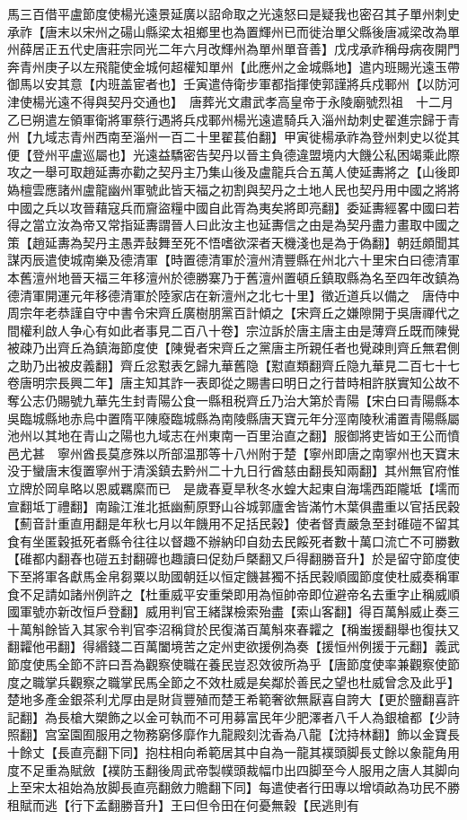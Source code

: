 馬三百借平盧節度使楊光遠景延廣以詔命取之光遠怒曰是疑我也密召其子單州刺史承祚【唐末以宋州之碭山縣梁太祖鄉里也為置輝州已而徙治單父縣後唐㓕梁改為單州薛居正五代史唐莊宗同光二年六月改輝州為單州單音善】戊戌承祚稱母病夜開門奔青州庚子以左飛龍使金城何超權知單州【此應州之金城縣地】遣内班賜光遠玉帶御馬以安其意【内班盖宦者也】壬寅遣侍衛步軍都指揮使郭謹將兵戍鄆州【以防河津使楊光遠不得與契丹交通也】　唐葬光文肅武孝高皇帝于永陵廟號烈祖　十二月乙巳朔遣左領軍衛將軍蔡行遇將兵戍鄆州楊光遠遣騎兵入淄州劫刺史翟進宗歸于青州【九域志青州西南至淄州一百二十里翟萇伯翻】甲寅徙楊承祚為登州刺史以從其便【登州平盧巡屬也】光遠益驕密告契丹以晉主負德違盟境内大饑公私困竭乘此際攻之一舉可取趙延夀亦勸之契丹主乃集山後及盧龍兵合五萬人使延夀將之【山後即媯檀雲應諸州盧龍幽州軍號此皆天福之初割與契丹之土地人民也契丹用中國之將將中國之兵以攻晉藉寇兵而齎盜糧中國自此胥為夷矣將即亮翻】委延夀經畧中國曰若得之當立汝為帝又常指延夀謂晉人曰此汝主也延夀信之由是為契丹盡力畫取中國之策【趙延夀為契丹主愚弄鼔舞至死不悟嗜欲深者天機淺也是為于偽翻】朝廷頗聞其謀丙辰遣使城南樂及德清軍【時置德清軍於澶州清豐縣在州北六十里宋白曰德清軍本舊澶州地晉天福三年移澶州於德勝寨乃于舊澶州置頓丘鎮取縣為名至四年改鎮為德清軍開運元年移德清軍於陸家店在新澶州之北七十里】徵近道兵以備之　唐侍中周宗年老恭謹自守中書令宋齊丘廣樹朋黨百計傾之【宋齊丘之嫌隙開于吳唐禪代之間權利啟人争心有如此者事見二百八十卷】宗泣訴於唐主唐主由是薄齊丘既而陳覺被疎乃出齊丘為鎮海節度使【陳覺者宋齊丘之黨唐主所親任者也覺疎則齊丘無君側之助乃出被皮義翻】齊丘忿懟表乞歸九華舊隐【懟直類翻齊丘隐九華見二百七十七卷唐明宗長興二年】唐主知其詐一表即從之賜書曰明日之行昔時相許朕實知公故不奪公志仍賜號九華先生封青陽公食一縣租税齊丘乃治大第於青陽【宋白曰青陽縣本吳臨城縣地赤烏中置隋平陳廢臨城縣為南陵縣唐天寶元年分涇南陵秋浦置青陽縣屬池州以其地在青山之陽也九域志在州東南一百里治直之翻】服御將吏皆如王公而憤邑尤甚　寧州酋長莫彦殊以所部温那等十八州附于楚【寧州即唐之南寧州也天寶末没于蠻唐末復置寧州于清溪鎮去黔州二十九日行酋慈由翻長知兩翻】其州無官府惟立牌於岡阜略以恩威羈縻而已　是歲春夏旱秋冬水蝗大起東自海壖西距隴坻【壖而宣翻坻丁禮翻】南踰江淮北抵幽薊原野山谷城郭廬舍皆滿竹木葉俱盡重以官括民穀【薊音計重直用翻是年秋七月以年饑用不足括民穀】使者督責嚴急至封碓磑不留其食有坐匿穀抵死者縣令往往以督趣不辦納印自劾去民餒死者數十萬口流亡不可勝數【碓都内翻舂也磑五封翻䃺也趣讀曰促劾戶槩翻又戶得翻勝音升】於是留守節度使下至將軍各獻馬金帛芻粟以助國朝廷以恒定饑甚獨不括民穀順國節度使杜威奏稱軍食不足請如諸州例許之【杜重威平安重榮即用為恒帥帝即位避帝名去重字止稱威順國軍號亦新改恒戶登翻】威用判官王緒謀檢索殆盡【索山客翻】得百萬斛威止奏三十萬斛餘皆入其家令判官李沼稱貸於民復滿百萬斛來春糶之【稱蚩援翻舉也復扶又翻糶他弔翻】得緡錢二百萬闔境苦之定州吏欲援例為奏【援恒州例援于元翻】義武節度使馬全節不許曰吾為觀察使職在養民豈忍效彼所為乎【唐節度使率兼觀察使節度之職掌兵觀察之職掌民馬全節之不效杜威是矣鄰於善民之望也杜威曾念及此乎】　楚地多產金銀茶利尤厚由是財貨豐殖而楚王希範奢欲無厭喜自誇大【更於鹽翻喜許記翻】為長槍大槊飾之以金可執而不可用募富民年少肥澤者八千人為銀槍都【少詩照翻】宫室園囿服用之物務窮侈靡作九龍殿刻沈香為八龍【沈持林翻】飾以金寶長十餘丈【長直亮翻下同】抱柱相向希範居其中自為一龍其襆頭脚長丈餘以象龍角用度不足重為賦斂【襆防玉翻後周武帝製幞頭裁幅巾出四脚至今人服用之唐人其脚向上至宋太祖始為放脚長直亮翻斂力贍翻下同】每遣使者行田專以增頃畝為功民不勝租賦而逃【行下孟翻勝音升】王曰但令田在何憂無穀【民逃則有